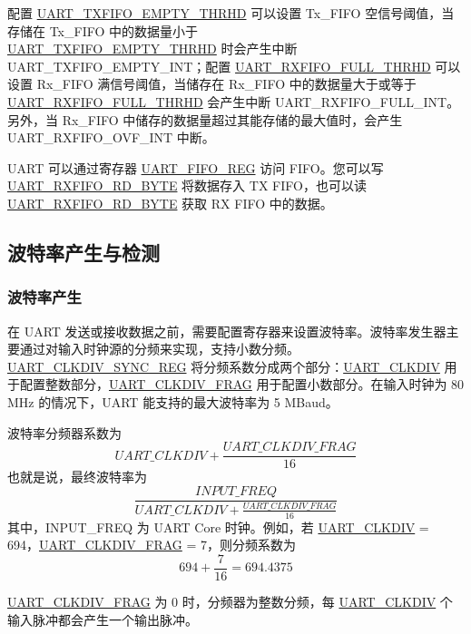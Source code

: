 \documentclass[main\_\_CN.tex]{subfiles}
\begin{document}
配置 \hyperref[fielddesc:UARTTXFIFOEMPTYTHRHD]{UART\_TXFIFO\_EMPTY\_THRHD} 可以设置 Tx\_FIFO 空信号阈值，当存储在 Tx\_FIFO 中的数据量小于 \\\hyperref[fielddesc:UARTTXFIFOEMPTYTHRHD]{UART\_TXFIFO\_EMPTY\_THRHD} 时会产生中断 UART\_TXFIFO\_EMPTY\_INT；配置 \hyperref[fielddesc:UARTRXFIFOFULLTHRHD]{UART\_RXFIFO\_FULL\_THRHD} 可以设置 Rx\_FIFO 满信号阈值，当储存在 Rx\_FIFO 中的数据量大于或等于 \hyperref[fielddesc:UARTRXFIFOFULLTHRHD]{UART\_RXFIFO\_FULL\_THRHD} 会产生中断 UART\_RXFIFO\_FULL\_INT。另外，当 Rx\_FIFO 中储存的数据量超过其能存储的最大值时，会产生 UART\_RXFIFO\_OVF\_INT 中断。

UART 可以通过寄存器 \hyperref[regdesc:UARTFIFOREG]{UART\_FIFO\_REG} 访问 FIFO。您可以写 \hyperref[fielddesc:UARTRXFIFORDBYTE]{UART\_RXFIFO\_RD\_BYTE} 将数据存入 TX FIFO，也可以读 \hyperref[fielddesc:UARTRXFIFORDBYTE]{UART\_RXFIFO\_RD\_BYTE} 获取 RX FIFO 中的数据。
\subsection{波特率产生与检测}

\subsubsection{波特率产生}

在 UART 发送或接收数据之前，需要配置寄存器来设置波特率。波特率发生器主要通过对输入时钟源的分频来实现，支持小数分频。\hyperref[regdesc:UARTCLKDIVSYNCREG]{UART\_CLKDIV\_SYNC\_REG} 将分频系数分成两个部分：\hyperref[fielddesc:UARTCLKDIV]{UART\_CLKDIV} 用于配置整数部分，\hyperref[fielddesc:UARTCLKDIVFRAG]{UART\_CLKDIV\_FRAG} 用于配置小数部分。在输入时钟为 80 MHz 的情况下，UART 能支持的最大波特率为 5 MBaud。

波特率分频器系数为
\[
    \hyperref[fielddesc:UARTCLKDIV]{UART\_CLKDIV} + \frac{\hyperref[fielddesc:UARTCLKDIVFRAG]{UART\_CLKDIV\_FRAG}}{16}
\]
也就是说，最终波特率为
\[
    \frac{INPUT\_FREQ}{\hyperref[fielddesc:UARTCLKDIV]{UART\_CLKDIV} + \frac{\hyperref[fielddesc:UARTCLKDIVFRAG]{UART\_CLKDIV\_FRAG}}{16}}
\]
其中，INPUT\_FREQ 为 UART Core 时钟。例如，若 \hyperref[fielddesc:UARTCLKDIV]{UART\_CLKDIV} = 694，\hyperref[fielddesc:UARTCLKDIVFRAG]{UART\_CLKDIV\_FRAG} = 7，则分频系数为
\[
    694 + \frac{7}{16} = 694.4375
\]


\hyperref[fielddesc:UARTCLKDIVFRAG]{UART\_CLKDIV\_FRAG} 为 0 时，分频器为整数分频，每 \hyperref[fielddesc:UARTCLKDIV]{UART\_CLKDIV} 个输入脉冲都会产生一个输出脉冲。
\end{document}
